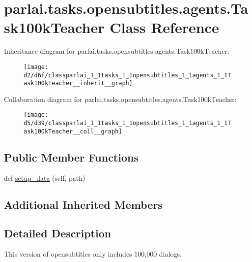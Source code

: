 \hypertarget{classparlai_1_1tasks_1_1opensubtitles_1_1agents_1_1Task100kTeacher}{}\section{parlai.\+tasks.\+opensubtitles.\+agents.\+Task100k\+Teacher Class Reference}
\label{classparlai_1_1tasks_1_1opensubtitles_1_1agents_1_1Task100kTeacher}


Inheritance diagram for parlai.\+tasks.\+opensubtitles.\+agents.\+Task100k\+Teacher\+:\nopagebreak
\begin{figure}[H]
\begin{center}
\leavevmode
\texttt{[image: d2/d6f/classparlai\_1\_1tasks\_1\_1opensubtitles\_1\_1agents\_1\_1Task100kTeacher\_\_inherit\_\_graph]}
\end{center}
\end{figure}


Collaboration diagram for parlai.\+tasks.\+opensubtitles.\+agents.\+Task100k\+Teacher\+:\nopagebreak
\begin{figure}[H]
\begin{center}
\leavevmode
\texttt{[image: d5/d39/classparlai\_1\_1tasks\_1\_1opensubtitles\_1\_1agents\_1\_1Task100kTeacher\_\_coll\_\_graph]}
\end{center}
\end{figure}
\subsection*{Public Member Functions}
\begin{DoxyCompactItemize}
\item 
def \hyperlink{classparlai_1_1tasks_1_1opensubtitles_1_1agents_1_1Task100kTeacher_ac1bceba11d526547b201f29a15427deb}{setup\+\_\+data} (self, path)
\end{DoxyCompactItemize}
\subsection*{Additional Inherited Members}


\subsection{Detailed Description}
\begin{DoxyVerb}This version of opensubtitles only includes 100,000 dialogs.
\end{DoxyVerb}
 

